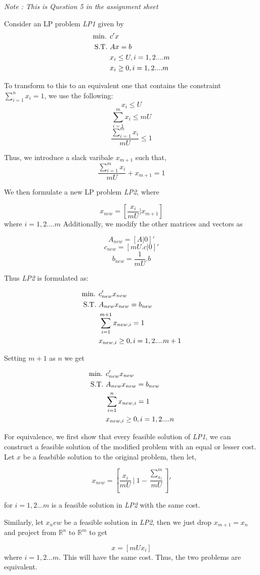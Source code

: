 \textit{Note : This is Question 5 in the assignment sheet}

Consider an LP problem \textit{LP1} given by
\begin{align}
    \text{min. } &c'x \notag\\
    \text{S.T. } &Ax = b \notag\\
    &x_i \le U, i = 1,2....m \notag\\
    &x_i \ge 0, i = 1,2....m \notag\\
\end{align}

To transform to this to an equivalent one that contains the constraint $\sum_{i=1}^{n}x_i = 1$, we use the following: 
\[ x_i \le U\]
\[ \sum_{i=1}^{m}x_i \le mU \]
\[ \frac{\sum_{i=1}^{m}x_i}{mU} \le 1\]

Thus, we introduce a slack varibale $x_{m+1}$ such that, 
\[ \frac{\sum_{i=1}^{m}x_i}{mU} + x_{m+1} = 1\]

We then formulate a new LP problem \textit{LP2}, where

\[ x_{new} = [\frac{x_i}{mU} | x_{m+1}]\]
where $i=1,2....m$
Additionally, we modify the other matrices and vectors as 

\[ A_{new} = [A | 0]'\]
\[ c_{new} = [mU.c | 0]'\]
\[ b_{new} = \frac{1}{mU}.b\]

Thus \textit{LP2} is formulated as:


\begin{align}
    \text{min. } &c_{new}'x_{new} \notag\\
    \text{S.T. } &A_{new}x_{new} = b_{new} \notag\\
    &\sum_{i=1}^{m+1}x_{new,i} = 1 \notag \\
    &x_{new,i} \ge 0, i = 1,2....m+1 \notag\\
\end{align}

Setting $m+1$ as $n$ we get

\begin{align}
    \text{min. } &c_{new}'x_{new} \notag\\
    \text{S.T. } &A_{new}x_{new} = b_{new} \notag\\
    &\sum_{i=1}^{n}x_{new,i} = 1 \notag \\
    &x_{new,i} \ge 0, i = 1,2....n \notag\\
\end{align}


For equivalence, we first show that every feasible solution of \textit{LP1}, we can construct a feasible solution of the modified problem with an equal or lesser cost. \\

Let $x$ be a feasbible solution to the original problem, then let,

\[x_{new} = \left[\frac{x_i}{mU} \:|\: 1 - \frac{\sum_{x_i}^{m}}{mU}\right]'\]

for $i=1,2...m$ is a feasible solution in \textit{LP2} with the same cost.

Similarly, let $x_new$ be a feasible solution in \textit{LP2}, then we just drop $x_{m+1} = x_{n}$ and project from $\mathbb{R}^n \text{ to } \mathbb{R}^m$ to get

\[ x = [mUx_i]\]
where $i=1,2...m$. This will have the same cost. Thus, the two problems are equivalent.